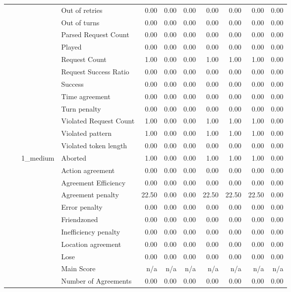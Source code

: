 \begin{tabular}{llllrrrrrrr}
 &  &  & Out of retries & 0.00 & 0.00 & 0.00 & 0.00 & 0.00 & 0.00 & 0.00 \\
 &  &  & Out of turns & 0.00 & 0.00 & 0.00 & 0.00 & 0.00 & 0.00 & 0.00 \\
 &  &  & Parsed Request Count & 0.00 & 0.00 & 0.00 & 0.00 & 0.00 & 0.00 & 0.00 \\
 &  &  & Played & 0.00 & 0.00 & 0.00 & 0.00 & 0.00 & 0.00 & 0.00 \\
 &  &  & Request Count & 1.00 & 0.00 & 0.00 & 1.00 & 1.00 & 1.00 & 0.00 \\
 &  &  & Request Success Ratio & 0.00 & 0.00 & 0.00 & 0.00 & 0.00 & 0.00 & 0.00 \\
 &  &  & Success & 0.00 & 0.00 & 0.00 & 0.00 & 0.00 & 0.00 & 0.00 \\
 &  &  & Time agreement & 0.00 & 0.00 & 0.00 & 0.00 & 0.00 & 0.00 & 0.00 \\
 &  &  & Turn penalty & 0.00 & 0.00 & 0.00 & 0.00 & 0.00 & 0.00 & 0.00 \\
 &  &  & Violated Request Count & 1.00 & 0.00 & 0.00 & 1.00 & 1.00 & 1.00 & 0.00 \\
 &  &  & Violated pattern & 1.00 & 0.00 & 0.00 & 1.00 & 1.00 & 1.00 & 0.00 \\
 &  &  & Violated token length & 0.00 & 0.00 & 0.00 & 0.00 & 0.00 & 0.00 & 0.00 \\
\cline{3-11}
 &  & \multirow[t]{27}{*}{1_medium} & Aborted & 1.00 & 0.00 & 0.00 & 1.00 & 1.00 & 1.00 & 0.00 \\
 &  &  & Action agreement & 0.00 & 0.00 & 0.00 & 0.00 & 0.00 & 0.00 & 0.00 \\
 &  &  & Agreement Efficiency & 0.00 & 0.00 & 0.00 & 0.00 & 0.00 & 0.00 & 0.00 \\
 &  &  & Agreement penalty & 22.50 & 0.00 & 0.00 & 22.50 & 22.50 & 22.50 & 0.00 \\
 &  &  & Error penalty & 0.00 & 0.00 & 0.00 & 0.00 & 0.00 & 0.00 & 0.00 \\
 &  &  & Friendzoned & 0.00 & 0.00 & 0.00 & 0.00 & 0.00 & 0.00 & 0.00 \\
 &  &  & Inefficiency penalty & 0.00 & 0.00 & 0.00 & 0.00 & 0.00 & 0.00 & 0.00 \\
 &  &  & Location agreement & 0.00 & 0.00 & 0.00 & 0.00 & 0.00 & 0.00 & 0.00 \\
 &  &  & Lose & 0.00 & 0.00 & 0.00 & 0.00 & 0.00 & 0.00 & 0.00 \\
 &  &  & Main Score & n/a & n/a & n/a & n/a & n/a & n/a & n/a \\
 &  &  & Number of Agreements & 0.00 & 0.00 & 0.00 & 0.00 & 0.00 & 0.00 & 0.00 \\

\end{tabular}
